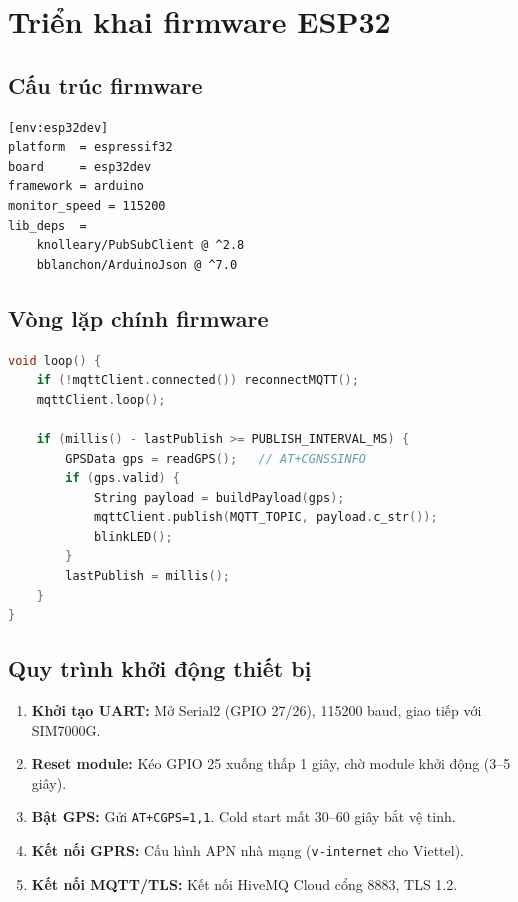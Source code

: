 \documentclass[13pt, a4paper]{report}
\begin{document}
\section{Triển khai firmware ESP32}

\subsection{Cấu trúc firmware}

\begin{lstlisting}[language=bash, caption=platformio.ini]
[env:esp32dev]
platform  = espressif32
board     = esp32dev
framework = arduino
monitor_speed = 115200
lib_deps  =
    knolleary/PubSubClient @ ^2.8
    bblanchon/ArduinoJson @ ^7.0
\end{lstlisting}

\subsection{Vòng lặp chính firmware}

\begin{lstlisting}[language=C++, caption=Vòng lặp chính main.cpp]
void loop() {
    if (!mqttClient.connected()) reconnectMQTT();
    mqttClient.loop();

    if (millis() - lastPublish >= PUBLISH_INTERVAL_MS) {
        GPSData gps = readGPS();   // AT+CGNSSINFO
        if (gps.valid) {
            String payload = buildPayload(gps);
            mqttClient.publish(MQTT_TOPIC, payload.c_str());
            blinkLED();
        }
        lastPublish = millis();
    }
}
\end{lstlisting}

\subsection{Quy trình khởi động thiết bị}

\begin{enumerate}
  \item \textbf{Khởi tạo UART:} Mở Serial2 (GPIO 27/26), 115200 baud, giao tiếp với SIM7000G.
  \item \textbf{Reset module:} Kéo GPIO 25 xuống thấp 1 giây, chờ module khởi động (3--5 giây).
  \item \textbf{Bật GPS:} Gửi \texttt{AT+CGPS=1,1}. Cold start mất 30--60 giây bắt vệ tinh.
  \item \textbf{Kết nối GPRS:} Cấu hình APN nhà mạng (\texttt{v-internet} cho Viettel).
  \item \textbf{Kết nối MQTT/TLS:} Kết nối HiveMQ Cloud cổng 8883, TLS 1.2.
\end{enumerate}
\end{document}
